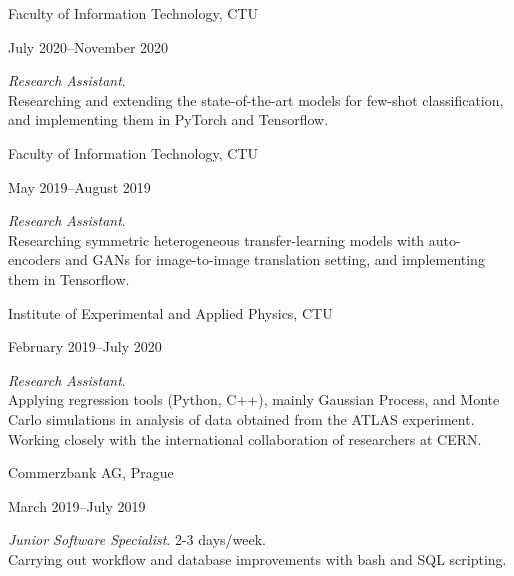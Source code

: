 \documentclass[10pt]{article}
\begin{document}
\begin{large}
    Faculty of Information Technology, CTU\hfill
    \begin{small}
        July 2020--November 2020\\[0.2em]
    \end{small}
\end{large}
\begin{normalsize}
    \textit{Research Assistant}.\\[0.2em]
    Researching and extending the state-of-the-art models for few-shot classification, and implementing them in PyTorch and Tensorflow.\\
\end{normalsize}

\begin{large}
    Faculty of Information Technology, CTU\hfill
    \begin{small}
        May 2019--August 2019\\[0.2em]
    \end{small}
\end{large}
\begin{normalsize}
    \textit{Research Assistant}.\\[0.2em]
    Researching symmetric heterogeneous transfer-learning models with auto-encoders and GANs for image-to-image translation setting, and implementing them in Tensorflow.\\
\end{normalsize}

\begin{large}
    Institute of Experimental and Applied Physics, CTU\hfill
    \begin{small}
        February 2019--July 2020\\[0.2em]
    \end{small}
\end{large}
\begin{normalsize}
    \textit{Research Assistant}.\\[0.2em]
    Applying regression tools (Python, C++), mainly Gaussian Process, and Monte Carlo simulations in analysis of data obtained from the ATLAS experiment. Working closely with the international collaboration of researchers at CERN.\\
\end{normalsize}

\begin{large}
    Commerzbank AG, Prague\hfill
    \begin{small}
        March 2019--July 2019\\[0.2em]
    \end{small}
\end{large}
\begin{normalsize}
    \textit{Junior Software Specialist}. 2-3 days/week.\\[0.2em]
    Carrying out workflow and database improvements with bash and SQL scripting.\\
\end{normalsize}
\end{document}
